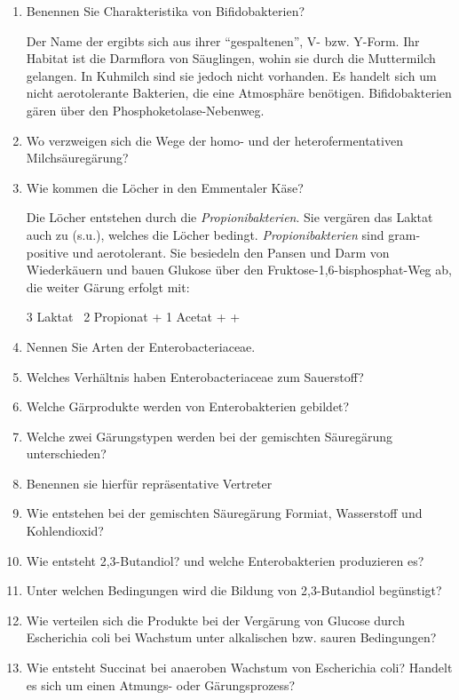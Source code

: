 \begin{enumerate}
	\item Benennen Sie Charakteristika von Bifidobakterien?
		
		Der Name der ergibts sich aus ihrer ``gespaltenen'', V- bzw. Y-Form.
		Ihr Habitat ist die Darmflora von Säuglingen,
		wohin sie durch die Muttermilch gelangen.
		In Kuhmilch sind sie jedoch nicht vorhanden.
		Es handelt sich um nicht aerotolerante Bakterien,
		die eine  Atmosphäre benötigen.
		Bifidobakterien gären über den Phosphoketolase-Nebenweg.

	\item Wo verzweigen sich die Wege der homo- und der heterofermentativen Milchsäuregärung?
	\item Wie kommen die Löcher in den Emmentaler Käse?

		Die Löcher entstehen durch die \emph{Propionibakterien}.
		Sie vergären das Laktat auch zu  (s.u.),
		welches die Löcher bedingt.
		\emph{Propionibakterien} sind gram-positive und	aerotolerant.
		Sie besiedeln den Pansen und Darm von Wiederkäuern und bauen Glukose über den
		Fruktose-1,6-bisphosphat-Weg ab, die weiter Gärung erfolgt mit:
		
		3 Laktat \textrightarrow \ 2 Propionat + 1 Acetat +  + 

	\item Nennen Sie Arten der Enterobacteriaceae.
	\item Welches Verhältnis haben Enterobacteriaceae zum Sauerstoff?
	\item Welche Gärprodukte werden von Enterobakterien gebildet?
	\item Welche zwei Gärungstypen werden bei der gemischten Säuregärung unterschieden?
	\item Benennen sie hierfür repräsentative Vertreter
	\item Wie entstehen bei der gemischten Säuregärung Formiat, Wasserstoff und Kohlendioxid?
	\item Wie entsteht 2,3-Butandiol? und welche Enterobakterien produzieren es?
	\item Unter welchen Bedingungen wird die Bildung von 2,3-Butandiol begünstigt?
	\item Wie verteilen sich die Produkte bei der Vergärung von Glucose durch Escherichia coli bei Wachstum unter alkalischen bzw. sauren Bedingungen?
	\item Wie entsteht Succinat bei anaeroben Wachstum von Escherichia coli? Handelt es sich um einen Atmungs- oder Gärungsprozess?
\end{enumerate}
